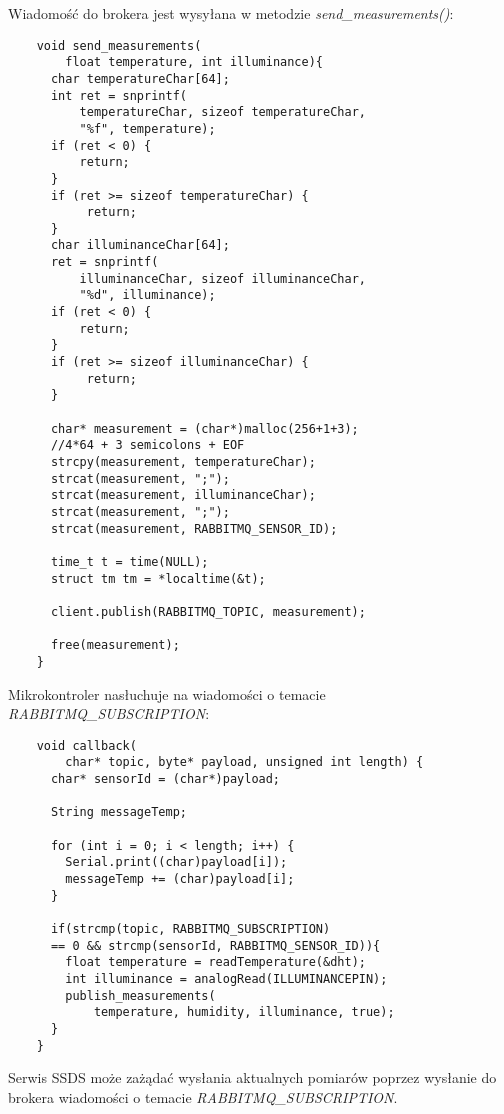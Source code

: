 Wiadomość do brokera jest wysyłana w metodzie \textit{send\_measurements()}:

\begin{lstlisting}
    void send_measurements(
        float temperature, int illuminance){
      char temperatureChar[64];
      int ret = snprintf(
          temperatureChar, sizeof temperatureChar, 
          "%f", temperature);
      if (ret < 0) {
          return;
      }
      if (ret >= sizeof temperatureChar) {
           return;
      }
      char illuminanceChar[64];
      ret = snprintf(
          illuminanceChar, sizeof illuminanceChar, 
          "%d", illuminance);
      if (ret < 0) {
          return;
      }
      if (ret >= sizeof illuminanceChar) {
           return;
      }
    
      char* measurement = (char*)malloc(256+1+3); 
      //4*64 + 3 semicolons + EOF
      strcpy(measurement, temperatureChar);
      strcat(measurement, ";");
      strcat(measurement, illuminanceChar);
      strcat(measurement, ";");
      strcat(measurement, RABBITMQ_SENSOR_ID);
    
      time_t t = time(NULL);
      struct tm tm = *localtime(&t);
    
      client.publish(RABBITMQ_TOPIC, measurement);
    
      free(measurement);
    }
\end{lstlisting}

Mikrokontroler nasłuchuje na wiadomości o temacie \textit{\\RABBITMQ\_SUBSCRIPTION}:

\begin{lstlisting}
    void callback(
        char* topic, byte* payload, unsigned int length) {
      char* sensorId = (char*)payload;
    
      String messageTemp;
      
      for (int i = 0; i < length; i++) {
        Serial.print((char)payload[i]);
        messageTemp += (char)payload[i];
      }
    
      if(strcmp(topic, RABBITMQ_SUBSCRIPTION) 
      == 0 && strcmp(sensorId, RABBITMQ_SENSOR_ID)){
        float temperature = readTemperature(&dht);
        int illuminance = analogRead(ILLUMINANCEPIN);
        publish_measurements(
            temperature, humidity, illuminance, true);
      }
    }
\end{lstlisting}

Serwis SSDS może zażądać wysłania aktualnych pomiarów poprzez wysłanie do brokera 
wiadomości o temacie \textit{RABBITMQ\_SUBSCRIPTION}.